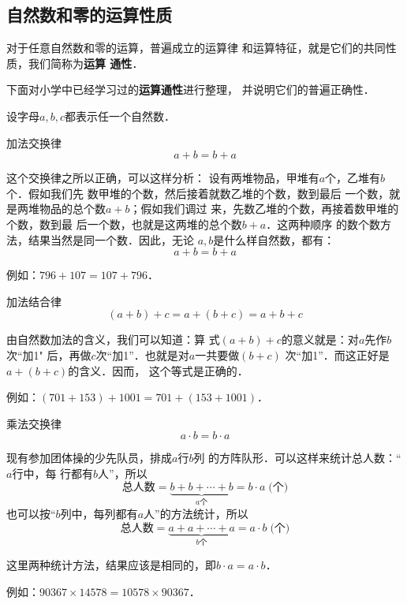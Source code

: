 \subsection{自然数和零的运算性质}
对于任意自然数和零的运算，普遍成立的运算律
和运算特征，就是它们的共同性质，我们简称为\textbf{运算
通性}．

下面对小学中已经学习过的\textbf{运算通性}进行整理，
并说明它们的普遍正确性．

设字母$a,  b,  c$都表示任一个自然数．

\begin{blk}{加法交换律}
\[a+b=b+a \]
\end{blk}
\begin{note}
    这个交换律之所以正确，可以这样分析：
设有两堆物品，甲堆有$a$个，乙堆有$b$个．假如我们先
数甲堆的个数，然后接着就数乙堆的个数，数到最后
一个数，就是两堆物品的总个数$a+b$；假如我们调过
来，先数乙堆的个数，再接着数甲堆的个数，数到最
后一个数，也就是这两堆的总个数$b+a$．这两种顺序
的数个数方法，结果当然是同一个数．因此，无论
$a, b$是什么样自然数，都有：
\[a+b=b+a \]

例如：$796+107=107+796$．
\end{note}


\begin{blk}{加法结合律}
    \[(a+b)+c=a+(b+c)=a+b+c \]
    \end{blk}
\begin{note}
    由自然数加法的含义，我们可以知道：算
式$(a+b) +c$的意义就是：对$a$先作$b$次“加1"
后，再做$c$次“加1”．也就是对$a$一共要做$(b+c)$
次“加1”．而这正好是$a+ (b+c)$的含义．因而，
这个等式是正确的．

    例如：$(701+153)+1001 =701+(153+1001)$．
\end{note}


    \begin{blk}{乘法交换律}
        \[a\cdot b=b\cdot a \]
        \end{blk}
\begin{note}
    现有参加团体操的少先队员，排成$a$行$b$列
的方阵队形．可以这样来统计总人数：“$a$行中，每
行都有$b$人”，所以
\[\text{总人数}=\underbrace{b+b+\cdots+b}_{a\text{个}}=b\cdot a \; \text{(个)} \]
也可以按“$b$列中，每列都有$a$人”的方法统计，所以
\[\text{总人数}=\underbrace{a+a+\cdots+a}_{b\text{个}}=a\cdot b \; \text{(个)} \]

这里两种统计方法，结果应该是相同的，即$b\cdot a=a\cdot b$．

例如：$90367 \times  14578=10578 \times  90367$．
\end{note}
        

